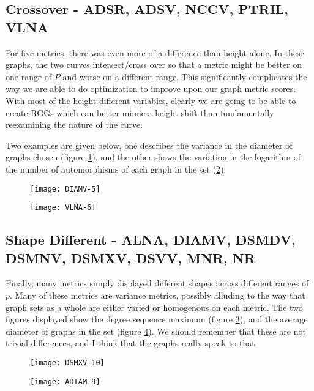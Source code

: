 \subsection*{Crossover - ADSR, ADSV, NCCV, PTRIL, VLNA}

For five metrics, there was even more of a difference than height alone.
In these graphs, the two curves intersect/cross over so that a metric might be better on one range of $P$ and worse on a different range.
This significantly complicates the way we are able to do optimization to improve upon our graph metric scores. 
With most of the height different variables, clearly we are going to be able to create RGGs which can better mimic a height shift than fundamentally reexamining the nature of the curve.

Two examples are given below, one describes the variance in the diameter of graphs chosen (figure \ref{fig:diamv5}), and the other shows the variation in the logarithm of the number of automorphisms of each graph in the set (\ref{fig:vlna6}).

\begin{figure}[h]
\caption{}
\centering
\texttt{[image: DIAMV-5]}
\label{fig:diamv5}
\end{figure}

\begin{figure}[h]
\caption{}
\centering
\texttt{[image: VLNA-6]}
\label{fig:vlna6}
\end{figure}

\subsection*{Shape Different - ALNA, DIAMV, DSMDV, DSMNV, DSMXV, DSVV, MNR, NR}
Finally, many metrics simply displayed different shapes across different ranges of $p$.
Many of these metrics are variance metrics, possibly alluding to the way that graph sets as a whole are either varied or homogenous on each metric.
The two figures displayed show the degree sequence maximum (figure \ref{fig:dsmxv10}), and the average diameter of graphs in the set (figure \ref{fig:adiam9}).
We should remember that these are not trivial differences, and I think that the graphs really speak to that.

\begin{figure}[h]
\caption{}
\centering
\texttt{[image: DSMXV-10]}
\label{fig:dsmxv10}
\end{figure}

\begin{figure}[h]
\caption{}
\centering
\texttt{[image: ADIAM-9]}
\label{fig:adiam9}
\end{figure}

